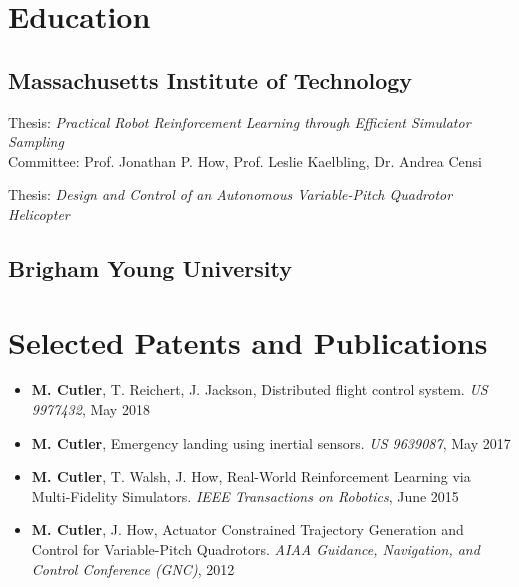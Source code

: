 \documentclass[letterpaper]{deedy-resume} %
\begin{document}
\begin{minipage}[t]{0.68\textwidth}
\section{Education}

\subsection{Massachusetts Institute of Technology}

Thesis:  \emph{Practical Robot Reinforcement Learning through Efficient
  Simulator Sampling} \\
Committee: Prof. Jonathan P. How, Prof. Leslie Kaelbling, Dr. Andrea Censi

\sectionspace %

Thesis:  \emph{Design and Control of an Autonomous Variable-Pitch Quadrotor Helicopter} \\

\sectionspace %

\subsection{Brigham Young University}


\sectionspace %



\section{Selected Patents and Publications}

\begin{itemize}
\item \textbf{M. Cutler}, T. Reichert, J. Jackson, Distributed flight control system. \emph{US 9977432}, May 2018
\item \textbf{M. Cutler}, Emergency landing using inertial sensors. \emph{US 9639087}, May 2017
\item \textbf{M. Cutler}, T. Walsh, J. How, Real-World Reinforcement Learning
  via Multi-Fidelity Simulators. \emph{IEEE Transactions on Robotics}, June 2015
\item \textbf{M. Cutler}, J. How, Actuator Constrained Trajectory Generation
  and Control for Variable-Pitch Quadrotors. \emph{AIAA Guidance, Navigation,
    and Control Conference (GNC)}, 2012
\end{itemize}


\end{minipage}
\end{document}
